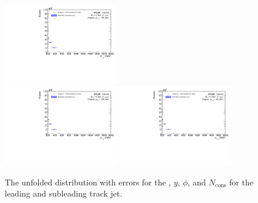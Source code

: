 \begin{figure}[h!]
  \includegraphics[page=516,width=0.45\textwidth]{figures/unfoldErrPlots.pdf} \\
  \includegraphics[page=656,width=0.45\textwidth]{figures/unfoldErrPlots.pdf}
  \includegraphics[page=684,width=0.45\textwidth]{figures/unfoldErrPlots.pdf}
  \caption{The unfolded distribution with errors for the \pt, $y$, $\phi$, and $N_{\text{cons}}$ for the leading and subleading track jet.}
  \label{fig:unfoldErr2}
\end{figure}

